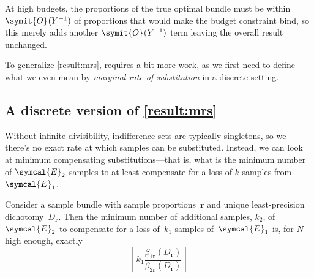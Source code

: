 \documentclass{fancyArticle}
\providecommand{\E}{\symcal{E}}             %
\renewcommand{\|}{\,|\,}                    %
\providecommand{\;}{\,;}                    %
\renewcommand{\O}{\symit{O}\:\!}            %
\begin{document}
\begin{appendix}
  At high budgets, the proportions of the true optimal bundle must be within $\O(Y^{-1})$ of proportions that would make the budget constraint bind, so this merely adds another $\O(Y^{-1})$ term leaving the overall result unchanged.

  To generalize \autoref{result:mrs}, requires a bit more work, as we first need to define what we even mean by \textit{marginal rate of substitution} in a discrete setting.


  \subsection{A discrete version of \autoref{result:mrs}}
  \label{sec:discrete-mrs}

  Without infinite divisibility, indifference sets are typically singletons, so we there's no exact rate at which samples can be substituted.
  Instead, we can look at minimum compensating substitutions---that is, what is the minimum number of $\E_{2}$ samples to at least compensate for a loss of $k$ samples from $\E_{1}$.

  \renewcommand{\theprop}{\arabic{prop}A}   %
  \setcounter{prop}{3}
  \begin{proposition}\label{result:discrete-mrs}
    Consider a sample bundle with sample proportions\, $\mathbf{r}$
    and unique least-precision dichotomy\, $D_{\mathbf{r}}$. Then the
    minimum number of additional samples, $k_2$, of $\E_2$ to compensate
    for a loss of\, $k_1$ samples of\, $\E_1$ is, for $N$ high enough, exactly
    \begin{equation*}
      \left\lceil k_1 \frac{\beta_{1\mathbf{r}}(D_{\mathbf{r}})}
        {\beta_{2\mathbf{r}}(D_{\mathbf{r}})}\right\rceil
    \end{equation*}
  \end{proposition}


\end{appendix}
\end{document}
